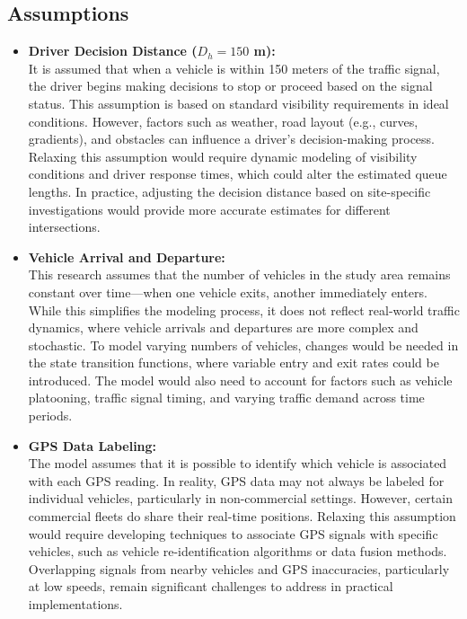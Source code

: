 \subsection{Assumptions}
\begin{itemize}
    \item \textbf{Driver Decision Distance ($D_h = 150$ m):} \\
    It is assumed that when a vehicle is within 150 meters of the traffic signal, the driver begins making decisions to stop or proceed based on the signal status. This assumption is based on standard visibility requirements in ideal conditions. However, factors such as weather, road layout (e.g., curves, gradients), and obstacles can influence a driver's decision-making process. Relaxing this assumption would require dynamic modeling of visibility conditions and driver response times, which could alter the estimated queue lengths. In practice, adjusting the decision distance based on site-specific investigations would provide more accurate estimates for different intersections.

    \item \textbf{Vehicle Arrival and Departure:} \\
    This research assumes that the number of vehicles in the study area remains constant over time—when one vehicle exits, another immediately enters. While this simplifies the modeling process, it does not reflect real-world traffic dynamics, where vehicle arrivals and departures are more complex and stochastic. To model varying numbers of vehicles, changes would be needed in the state transition functions, where variable entry and exit rates could be introduced. The model would also need to account for factors such as vehicle platooning, traffic signal timing, and varying traffic demand across time periods.

    \item \textbf{GPS Data Labeling:} \\
    The model assumes that it is possible to identify which vehicle is associated with each GPS reading. In reality, GPS data may not always be labeled for individual vehicles, particularly in non-commercial settings. However, certain commercial fleets do share their real-time positions. Relaxing this assumption would require developing techniques to associate GPS signals with specific vehicles, such as vehicle re-identification algorithms or data fusion methods. Overlapping signals from nearby vehicles and GPS inaccuracies, particularly at low speeds, remain significant challenges to address in practical implementations.


\end{itemize}
